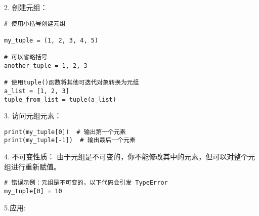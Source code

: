 \documentclass{article}
\begin{document}
2. 创建元组：
\begin{lstlisting}[caption={示例Python代码}]
# 使用小括号创建元组

my_tuple = (1, 2, 3, 4, 5)

# 可以省略括号
another_tuple = 1, 2, 3

# 使用tuple()函数将其他可迭代对象转换为元组
a_list = [1, 2, 3]
tuple_from_list = tuple(a_list)
\end{lstlisting}
3. 访问元组元素：
\begin{lstlisting}[caption={示例Python代码}]
print(my_tuple[0])  # 输出第一个元素
print(my_tuple[-1])  # 输出最后一个元素
\end{lstlisting}
4. 不可变性质：
由于元组是不可变的，你不能修改其中的元素，但可以对整个元组进行重新赋值。
\begin{lstlisting}[caption={示例Python代码}]
# 错误示例：元组是不可变的，以下代码会引发 TypeError
my_tuple[0] = 10
\end{lstlisting}
5.应用:
\end{document}

